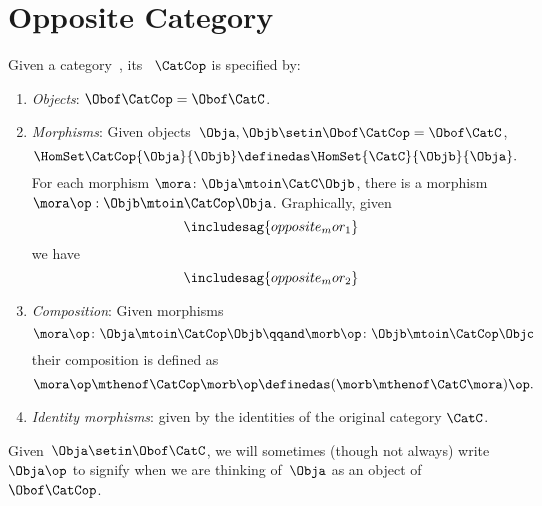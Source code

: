 
\section{Opposite Category}

\begin{ctdefinition}
    \label{def:opposite-category}
    \label{def:oppositecat}
    Given a category~\CatC, its ~$\CatCop$ is specified by:
    \begin{enumerate}
        \item \emph{Objects}: $\Obof\CatCop = \Obof\CatC$.

        \item \emph{Morphisms}: Given objects~$\Obja,  \Objb \setin \Obof\CatCop = \Obof\CatC$,
              \begin{equation}\label{eq:homset-op-cat}
                  \HomSet\CatCop{\Obja}{\Objb} \definedas \HomSet{\CatC}{\Objb}{\Obja}.
              \end{equation}
              For each morphism $\mora\colon\Obja\mtoin\CatC\Objb$, there is a morphism
              $\mora\op:\Objb\mtoin\CatCop\Obja$.
              Graphically, given
              \begin{equation}\label{eq:opposite_mor_1}
                  \includesag{opposite_mor_1}
              \end{equation}
              we have
              \begin{equation}
                  \label{eq:opposite_mor_2}
                  \includesag{opposite_mor_2}
              \end{equation}
        \item \emph{Composition}: Given morphisms
              \begin{equation}
                  \mora\op\colon \Obja \mtoin\CatCop \Objb
                  \qqand
                  \morb\op\colon \Objb \mtoin\CatCop \Objc
              \end{equation}
              their composition is defined as
              \begin{equation}
                  \mora\op \mthenof\CatCop \morb\op \definedas (\morb \mthenof\CatC \mora)\op.
              \end{equation}
        \item \emph{Identity morphisms}: given by the identities of the original category $\CatC$.
    \end{enumerate}
\end{ctdefinition}
Given~$\Obja \setin \Obof\CatC$, we will sometimes (though not always) write $\Obja\op$ to signify when we are thinking of~$\Obja$ as an object of~$\Obof\CatCop$.

